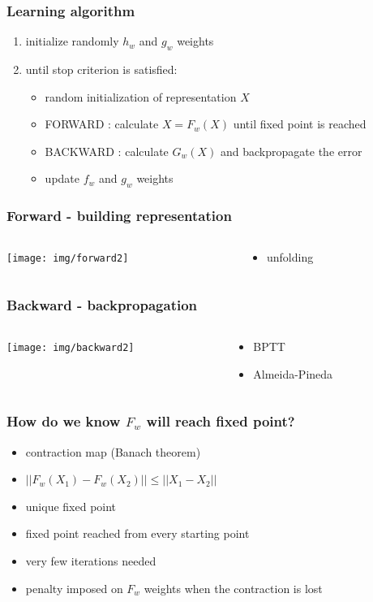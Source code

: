 \documentclass{beamer}
\begin{document}
\begin{frame}
\frametitle{Learning algorithm}
\begin{enumerate}
	\item initialize randomly $h_w$ and $g_w$ weights
	\item until stop criterion is satisfied:
	\begin{itemize}
		\item random initialization of representation $X$
		\item FORWARD : calculate $X = F_w(X)$ until fixed point is reached
		\item BACKWARD : calculate $G_w(X)$ and backpropagate the error
		\item update $f_w$ and $g_w$ weights
	\end{itemize}
\end{enumerate}
\end{frame}

\begin{frame}
\frametitle{Forward - building representation}
\begin{columns}
	\begin{column}{0.66\textwidth}
		\texttt{[image: img/forward2]}
	\end{column}
	\begin{column}{0.34\textwidth}
		\begin{itemize}
			\item unfolding
		\end{itemize}
	\end{column}
\end{columns}
\end{frame}

\begin{frame}
\frametitle{Backward - backpropagation}
\begin{columns}
	\begin{column}{0.66\textwidth}
		\texttt{[image: img/backward2]}
	\end{column}
	\begin{column}{0.34\textwidth}
		\begin{itemize}
			\item BPTT
			\item Almeida-Pineda
		\end{itemize}
	\end{column}
\end{columns}
\end{frame}

\begin{frame}
\frametitle{How do we know $F_w$ will reach fixed point?}
\begin{itemize}
	\item contraction map (Banach theorem)
	\item $||F_w(X_1) - F_w(X_2)|| \leq ||X_1 - X_2||$
	\item unique fixed point
	\item fixed point reached from every starting point
	\item very few iterations needed
	\item penalty imposed on $F_w$ weights when the contraction is lost
\end{itemize}
\end{frame}
\end{document}
